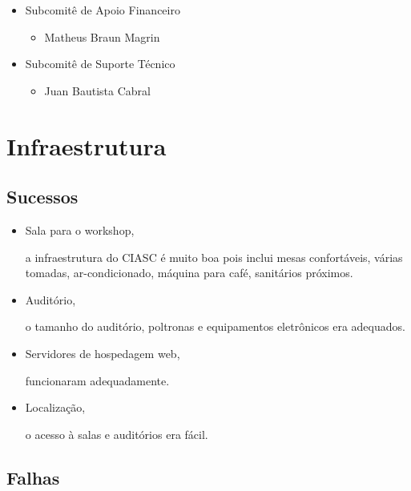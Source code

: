 \documentclass[12pt]{article}
\begin{document}
\begin{itemize}
  \item Subcomitê de Apoio Financeiro

    \begin{itemize}
      \item Matheus Braun Magrin
    \end{itemize}

  \item Subcomitê de Suporte Técnico

    \begin{itemize}
      \item Juan Bautista Cabral
    \end{itemize}

\end{itemize}

\newpage

\section*{Infraestrutura}

\subsection*{Sucessos}

\begin{itemize}
  \item Sala para o workshop,

    a infraestrutura do CIASC é muito boa pois inclui mesas confortáveis, várias
    tomadas, ar-condicionado, máquina para café, sanitários próximos.

  \item Auditório,

    o tamanho do auditório, poltronas e equipamentos eletrônicos era adequados.

  \item Servidores de hospedagem web,

    funcionaram adequadamente.

  \item Localização,

    o acesso à salas e auditórios era fácil.
\end{itemize}

\subsection*{Falhas}
\end{document}
